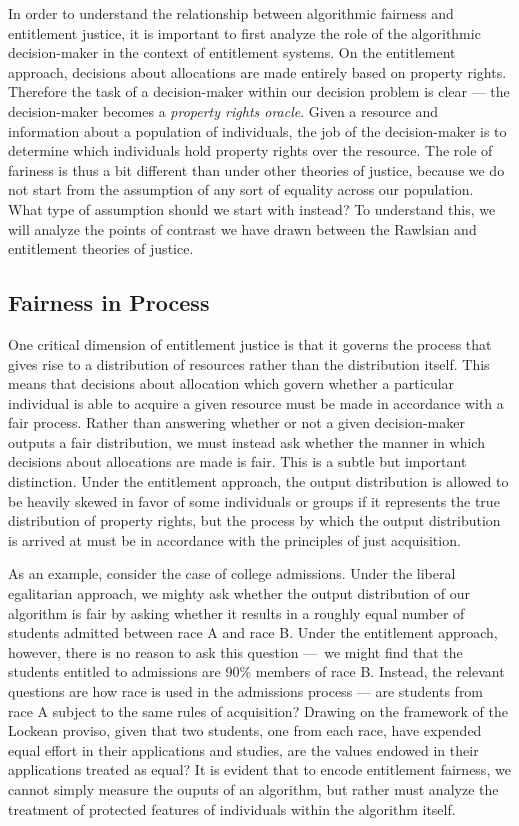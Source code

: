 In order to understand the relationship between algorithmic fairness and
entitlement justice, it is important to first analyze the role of the
algorithmic decision-maker in the context of entitlement systems. On the 
entitlement approach, decisions about allocations are made entirely based on
property rights. Therefore the task of a decision-maker within our decision
problem is clear — the decision-maker becomes a \emph{property rights oracle}.
Given a resource and information about a population of individuals, the job of
the decision-maker is to determine which individuals hold property rights over
the resource. The role of fariness is thus a bit different than under other
theories of justice, because we do not start from the assumption of any sort of
equality across our population. What type of assumption should we start with 
instead? To understand this, we will analyze the points of contrast we have
drawn between the Rawlsian and entitlement theories of justice.

\subsection{Fairness in Process}

One critical dimension of entitlement justice is that it governs the process
that gives rise to a distribution of resources rather than the distribution
itself. This means that decisions about allocation which govern whether a
particular individual is able to acquire a given resource must be made in
accordance with a fair process. Rather than answering whether or not a given
decision-maker outputs a fair distribution, we must instead ask whether the
manner in which decisions about allocations are made is fair. This is a
subtle but important distinction. Under the entitlement approach, the output
distribution is allowed to be heavily skewed in favor of some individuals or
groups if it represents the true distribution of property rights, but the
process by which the output distribution is arrived at must be in accordance
with the principles of just acquisition.

As an example, consider the case of college admissions. Under the liberal
egalitarian approach, we mighty ask whether the output distribution of our
algorithm is fair by asking whether it results in a roughly equal number of
students admitted between race A and race B. Under the entitlement approach,
however, there is no reason to ask this question — we might find that the
students entitled to admissions are 90\% members of race B. Instead, the
relevant questions are how race is used in the admissions process  — are
students from race A subject to the same rules of acquisition? Drawing on the
framework of the Lockean proviso, given that two students, one from each race,
have expended equal effort in their applications and studies, are the values
endowed in their applications treated as equal? It is evident that to encode
entitlement fairness, we cannot simply measure the ouputs of an algorithm, but
rather must analyze the treatment of protected features of individuals within
the algorithm itself.

